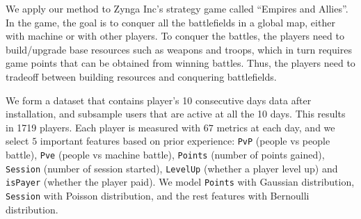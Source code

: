 We apply our method to Zynga Inc's strategy game called ``Empires and Allies''.
In the game, the goal is to conquer all the battlefields
in a global map,  either with machine or with other players. To conquer 
the battles, the players need to build/upgrade base resources such as weapons and troops, which in turn 
requires game points that can be obtained from winning battles.  Thus, the players need to 
tradeoff between building resources and conquering battlefields.


We form a dataset that contains player's 10 consecutive days data after installation, 
and subsample users that are active at all the 10 days. This results in 1719 players.
Each player is measured with $67$ metrics at each day, and we select $5$ important 
features based on prior experience: \texttt{PvP} (people vs people battle), 
\texttt{Pve} (people vs machine battle), \texttt{Points} (number of points gained), \texttt{Session} 
(number of session started), \texttt{LevelUp} (whether a player level up) and \texttt{isPayer} (whether
the player paid). We model \texttt{Points}  with Gaussian distribution, \texttt{Session} with
Poisson distribution, and the rest features with Bernoulli distribution.






